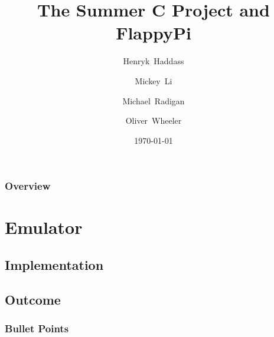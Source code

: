 \documentclass{beamer}
\title[FlappyPi]{The Summer C Project and FlappyPi} %
\author[Group 16]{\small Henryk~Haddass \and Mickey~Li \and Michael~Radigan \and Oliver~Wheeler}%
\institute[Imperial DoC] %
{
Group 16
\medskip
}
\date{\today} %
\begin{document}
\begin{frame}
\titlepage %
\end{frame}

\begin{frame}
\frametitle{Overview} %
\tableofcontents %
\end{frame}


\section{Emulator} %


\subsection{Implementation} %

\begin{frame}
\frametitle{}






\end{frame}

\subsection{Outcome}
\begin{frame}
\frametitle{Bullet Points}




\end{frame}
\end{document}

